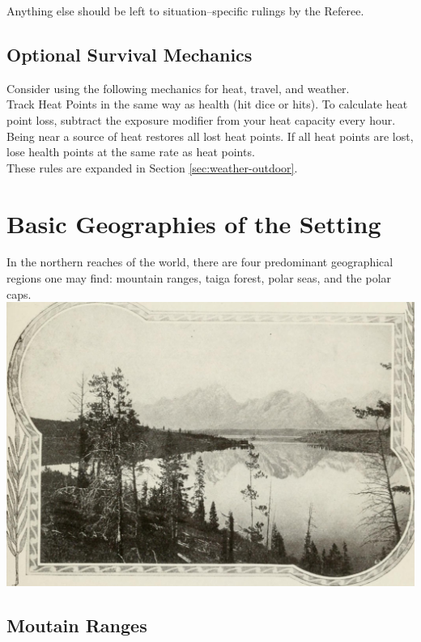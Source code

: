 \documentclass[notitlepage]{article}
\begin{document}
\begin{multicols}{2}
Anything else should be left to situation--specific rulings by the Referee.

\subsection*{Optional Survival Mechanics}

Consider using the following mechanics for heat, travel, and weather. \\

Track Heat Points in the same way as health (hit dice or hits).
To calculate heat point loss, subtract the exposure modifier from your heat capacity every hour.
Being near a source of heat restores all lost heat points.
If all heat points are lost, lose health points at the same rate as heat points. \\

These rules are expanded in Section \ref{sec:weather-outdoor}.

\section{Basic Geographies of the Setting}

In the northern reaches of the world, there are four predominant geographical regions one may find: mountain ranges, taiga forest, polar seas, and the polar caps. \\

{\centering
\includegraphics[width=\columnwidth]{geography-mountains}
}


\subsection*{Moutain Ranges}


\end{multicols}
\end{document}
